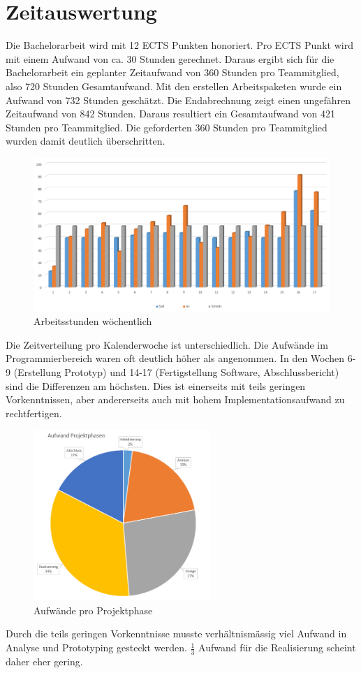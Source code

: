 \chapter{Zeitauswertung}
Die Bachelorarbeit wird mit 12 ECTS Punkten honoriert. Pro ECTS Punkt wird mit einem Aufwand von ca. 30 Stunden gerechnet. Daraus ergibt sich für die Bachelorarbeit ein geplanter Zeitaufwand von 360 Stunden pro Teammitglied, also 720 Stunden Gesamtaufwand. Mit den erstellen Arbeitspaketen wurde ein Aufwand von 732 Stunden
geschätzt. Die Endabrechnung zeigt einen ungefähren Zeitaufwand von 842 Stunden. Daraus resultiert ein Gesamtaufwand von 421 Stunden pro Teammitglied. Die geforderten 360 Stunden pro Teammitglied wurden damit deutlich überschritten.

\begin{figure}[H]
\centering
\includegraphics[width=1\textwidth]{../01_Projektplanung/images/weekly_done.png}
\caption{Arbeitsstunden wöchentlich}
\end{figure}

Die Zeitverteilung pro Kalenderwoche ist unterschiedlich. Die Aufwände im Programmierbereich waren oft deutlich höher als angenommen. In den Wochen 6-9 (Erstellung Prototyp) und 14-17 (Fertigstellung Software, Abschlussbericht) sind die Differenzen am höchsten. Dies ist einerseits mit teils geringen Vorkenntnissen, aber andererseits auch mit hohem Implementationsaufwand zu rechtfertigen. 

\begin{figure}[H]
\centering
\includegraphics[width=0.6\textwidth]{../01_Projektplanung/images/aufwand_phasen.png}
\caption{Aufwände pro Projektphase}
\end{figure}

Durch die teils geringen Vorkenntnisse musste verhältnismässig viel Aufwand in Analyse und Prototyping gesteckt werden. $\frac{1}{3}$ Aufwand für die Realisierung scheint daher eher gering.